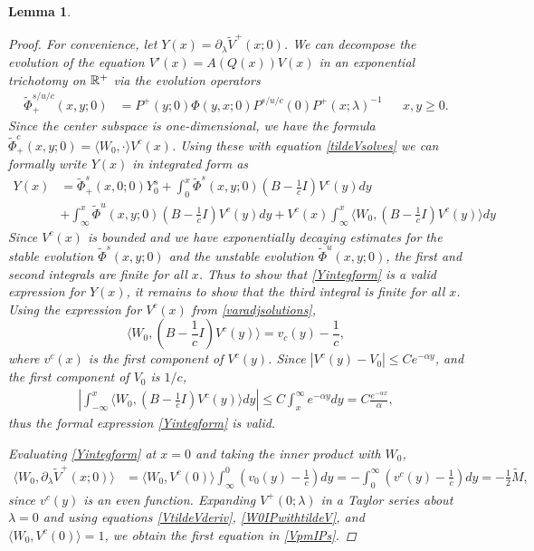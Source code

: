 \documentclass[10pt,reqno]{amsart}
\theoremstyle{plain}
\newtheorem{lemma}[theorem]{Lemma}
\theoremstyle{definition}
\theoremstyle{remark}
\numberwithin{theorem}{section}
\numberwithin{equation}{section}
\begin{document}
\begin{lemma}
\begin{proof}
For convenience, let $Y(x) = \partial_\lambda \tilde{V}^+(x; 0)$. We can decompose the evolution of the equation $V'(x) = A(Q(x)) V(x)$ in an exponential trichotomy on $\mathbb{R}^+$ via the evolution operators
\begin{align*}
\tilde{\Phi}_+^{s/u/c}(x, y; 0) &= P^+(y; 0) \Phi(y, x; 0) P^{s/u/c}(0) P^+(x; \lambda)^{-1} && x, y \geq 0.
\end{align*}
Since the center subspace is one-dimensional, we have the formula $\tilde{\Phi}_+^c(x, y; 0) = \langle W_0, \cdot \rangle V^c(x)$. Using these with equation \cref{tildeVsolves} we can formally write $Y(x)$ in integrated form as
\begin{equation}\label{Yintegform}
\begin{aligned}
Y(x) &= \tilde{\Phi}^s_+(x,0; 0)Y_0^s 
+ \int_0^x \tilde{\Phi}^s(x,y; 0)\left( B - \frac{1}{c}I \right) V^c(y) dy \\
&+ \int_{\infty}^x \tilde{\Phi}^u(x,y; 0)\left( B - \frac{1}{c}I \right) V^c(y) dy + V^c(x) \int_{\infty}^x \langle W_0, \left( B - \frac{1}{c}I \right) V^c(y) \rangle dy 
\end{aligned}
\end{equation}
Since $V^c(x)$ is bounded and we have exponentially decaying estimates for the stable evolution $\tilde{\Phi}^s(x,y; 0)$ and the unstable evolution $\tilde{\Phi}^u(x,y; 0)$, the first and second integrals are finite for all $x$. Thus to show that \cref{Yintegform} is a valid expression for $Y(x)$, it remains to show that the third integral is finite for all $x$. Using the expression for $V^c(x)$ from \cref{varadjsolutions}, 
\[
\langle W_0, \left( B - \frac{1}{c}I \right) V^c(y) \rangle = v_c(y) - \frac{1}{c},
\]
where $v^c(x)$ is the first component of $V^c(y)$. Since $|V^c(y) - V_0|\leq C e^{-\alpha y}$, and the first component of $V_0$ is $1/c$, 
\begin{align*}
\left| \int_{-\infty}^x \langle W_0, \left( B - \frac{1}{c}I \right) V^c(y) \rangle dy \right| 
\leq C \int_x^{\infty} e^{-\alpha y} dy = C \frac{e^{-\alpha x}}{\alpha},
\end{align*}
thus the formal expression \cref{Yintegform} is valid. 

Evaluating \cref{Yintegform} at $x = 0$ and taking the inner product with $W_0$, 
\begin{align}\label{W0IPwithtildeV}
\langle W_0, \partial_\lambda \tilde{V}^+(x; 0) \rangle
&= \langle W_0, V^c(0) \rangle \int_{\infty}^0 \left(v_0(y) - \frac{1}{c}\right) dy 
= -\int_0^{\infty} \left(v^c(y) - \frac{1}{c}\right) dy = -\frac{1}{2} \tilde{M},
\end{align}
since $v^c(y)$ is an even function. Expanding $V^+(0; \lambda)$ in a Taylor series about $\lambda = 0$ and using equations \cref{VtildeVderiv}, \cref{W0IPwithtildeV}, and $\langle W_0, V^c(0)\rangle = 1$, we obtain the first equation in \cref{VpmIPs}.


\end{proof}
\end{lemma}
\end{document}
